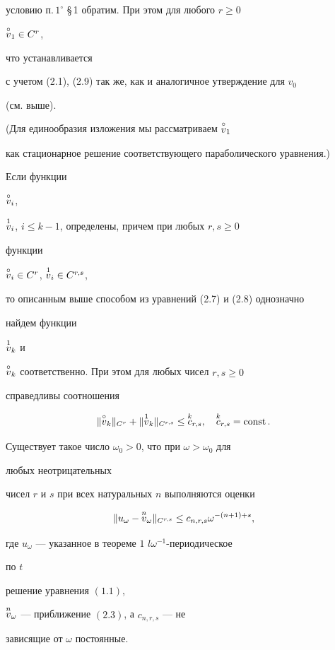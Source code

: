 условию п.\,$1^\circ$ \S\,1 обратим. При этом для любого $r\ge0$\; 


$\overset{\circ}{v}{}_1\in C^r$, 


что устанавливается 


с учетом (2.1), (2.9) так же, как и аналогичное утверждение для $v_0$ 


(см. выше). 


(Для единообразия изложения мы рассматриваем $\overset{\circ}{v}{}_1$ 


как стационарное решение соответствующего параболического уравнения.) 


 


Если функции 


$\overset{\circ}{v}{}_i$, 


$\overset{1}{v}{}_i$, $i\le k-1$, определены, причем при любых $r,s\ge0$ 


функции 


$\overset{\circ}{v}{}_i\in C^r$, $\overset{1}{v}{}_i\in C^{r,s}$, 


то описанным выше способом из уравнений (2.7) и (2.8) однозначно 


найдем функции 


$\overset{1}{v}{}_k$ и 


$\overset{\circ}{v}{}_k$ соответственно. При этом для любых чисел $r,s\ge0$ 


справедливы соотношения 


$$ 


\|\up{\circ}{v}_k\|_{C^r}+\|\up{1}{v}_k\|_{C^{r,s}}\le 


\up{k}{c}_{r,s},\quad \up{k}{c}_{r,s}=\const. 


$$ 


 


\begin{thm} 


Существует такое число $\omega_0>0$, что при $\omega>\omega_0$ для 


любых неотрицательных 


чисел $r$ и $s$ при всех натуральных $n$ выполняются оценки 


\begin{equation} 


\|u_\omega-\up{n}{v}_\omega\|_{C^{r,s}}\le 


c_{n,r,s}\omega^{-(n+1)+s}, 


\end{equation} 


где $u_\omega$ --- указанное в теореме $1$ $l\omega^{-1}$-периодическое 


по $t$ 


решение уравнения $(1.1)$, 


$\overset{n}{v}{}_\omega$ --- приближение $(2.3)$, а $c_{n,r,s}$ --- не 


зависящие от $\omega$ постоянные. 


\end{thm} 


